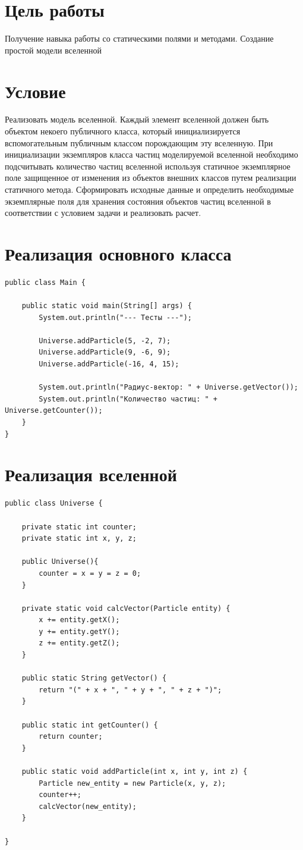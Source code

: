 \documentclass[a4paper, 14pt]{extarticle}
\begin{document}
\newpage
\section{Цель работы}
Получение навыка работы со статическими полями и методами. Создание простой модели вселенной

\section{Условие}
Реализовать модель вселенной. Каждый элемент вселенной должен быть объектом
некоего публичного класса, который инициализируется вспомогательным публичным
классом порождающим эту вселенную. При инициализации экземпляров класса частиц
моделируемой вселенной необходимо подсчитывать количество частиц вселенной используя
статичное экземплярное поле защищенное от изменения из объектов внешних классов путем
реализации статичного метода. Сформировать исходные данные и определить необходимые
экземплярные поля для хранения состояния объектов частиц вселенной в соответствии с
условием задачи и реализовать расчет.

\section{Реализация основного класса}
{\scriptsize
\begin{verbatim}
public class Main {

    public static void main(String[] args) {
        System.out.println("--- Тесты ---");

        Universe.addParticle(5, -2, 7);
        Universe.addParticle(9, -6, 9);
        Universe.addParticle(-16, 4, 15);

        System.out.println("Радиус-вектор: " + Universe.getVector());
        System.out.println("Количество частиц: " + Universe.getCounter());
    }
}
\end{verbatim}
}

\section{Реализация вселенной}
{\scriptsize
\begin{verbatim}
public class Universe {

    private static int counter;
    private static int x, y, z;

    public Universe(){
        counter = x = y = z = 0;
    }

    private static void calcVector(Particle entity) {
        x += entity.getX();
        y += entity.getY();
        z += entity.getZ();
    }

    public static String getVector() {
        return "(" + x + ", " + y + ", " + z + ")";
    }

    public static int getCounter() {
        return counter;
    }

    public static void addParticle(int x, int y, int z) {
        Particle new_entity = new Particle(x, y, z);
        counter++;
        calcVector(new_entity);
    }

}
\end{verbatim}
}
\end{document}

